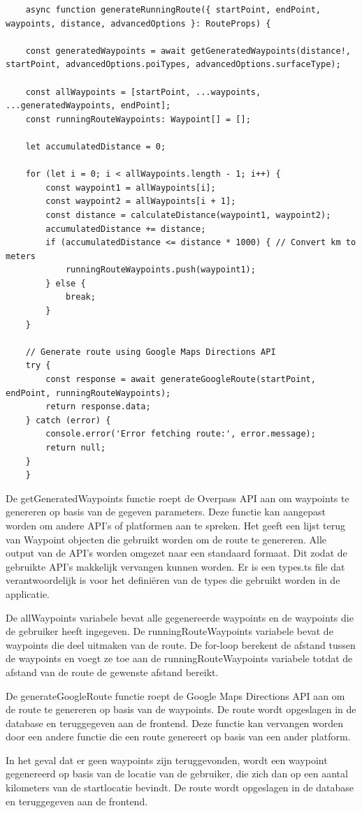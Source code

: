 \begin{lstlisting}
    async function generateRunningRoute({ startPoint, endPoint, waypoints, distance, advancedOptions }: RouteProps) {

    const generatedWaypoints = await getGeneratedWaypoints(distance!, startPoint, advancedOptions.poiTypes, advancedOptions.surfaceType);

    const allWaypoints = [startPoint, ...waypoints, ...generatedWaypoints, endPoint];
    const runningRouteWaypoints: Waypoint[] = [];

    let accumulatedDistance = 0;

    for (let i = 0; i < allWaypoints.length - 1; i++) {
        const waypoint1 = allWaypoints[i];
        const waypoint2 = allWaypoints[i + 1];
        const distance = calculateDistance(waypoint1, waypoint2);
        accumulatedDistance += distance;
        if (accumulatedDistance <= distance * 1000) { // Convert km to meters
            runningRouteWaypoints.push(waypoint1);
        } else {
            break;
        }
    }

    // Generate route using Google Maps Directions API
    try {
        const response = await generateGoogleRoute(startPoint, endPoint, runningRouteWaypoints);
        return response.data;
    } catch (error) {        
        console.error('Error fetching route:', error.message);
        return null;
    }
    }
\end{lstlisting}

De getGeneratedWaypoints functie roept de Overpass API aan om waypoints te genereren op basis van de gegeven parameters. Deze functie kan aangepast worden om andere API's of platformen aan te spreken. Het geeft een lijst terug van Waypoint objecten die gebruikt worden om de route te genereren. Alle output van de API's worden omgezet naar een standaard formaat. Dit zodat de gebruikte API's makkelijk vervangen kunnen worden. Er is een types.ts file dat verantwoordelijk is voor het definiëren van de types die gebruikt worden in de applicatie.

De allWaypoints variabele bevat alle gegenereerde waypoints en de waypoints die de gebruiker heeft ingegeven. De runningRouteWaypoints variabele bevat de waypoints die deel uitmaken van de route. De for-loop berekent de afstand tussen de waypoints en voegt ze toe aan de runningRouteWaypoints variabele totdat de afstand van de route de gewenste afstand bereikt. 

De generateGoogleRoute functie roept de Google Maps Directions API aan om de route te genereren op basis van de waypoints. De route wordt opgeslagen in de database en teruggegeven aan de frontend. Deze functie kan vervangen worden door een andere functie die een route genereert op basis van een ander platform.

In het geval dat er geen waypoints zijn teruggevonden, wordt een waypoint gegenereerd op basis van de locatie van de gebruiker, die zich dan op een aantal kilometers van de startlocatie bevindt. De route wordt opgeslagen in de database en teruggegeven aan de frontend.

